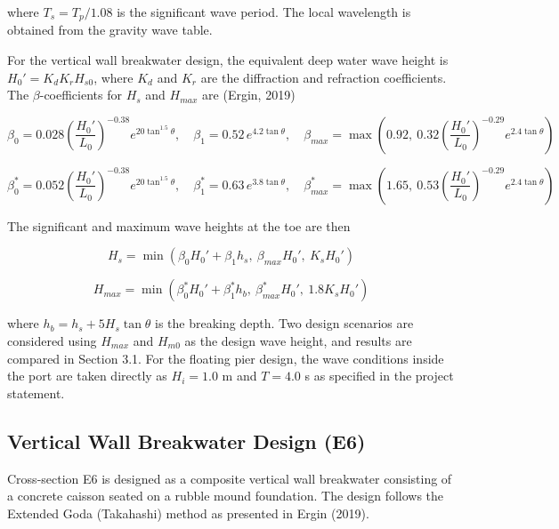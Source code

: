 \documentclass[a4paper, 11pt]{article}
\begin{document}
where $T_s = T_p/1.08$ is the significant wave period. The local wavelength is obtained from the gravity wave table.

For the vertical wall breakwater design, the equivalent deep water wave height is $H_0' = K_d K_r H_{s0}$, where $K_d$ and $K_r$ are the diffraction and refraction coefficients. The $\beta$-coefficients for $H_s$ and $H_{max}$ are (Ergin, 2019)

\begin{equation}
    \beta_0 = 0.028\left(\frac{H_0'}{L_0}\right)^{-0.38} e^{20\tan^{1.5}\theta}, \quad \beta_1 = 0.52\, e^{4.2\tan\theta}, \quad \beta_{max} = \max\!\left(0.92,\ 0.32\left(\frac{H_0'}{L_0}\right)^{-0.29} e^{2.4\tan\theta}\right)
\end{equation}

\begin{equation}
    \beta_0^* = 0.052\left(\frac{H_0'}{L_0}\right)^{-0.38} e^{20\tan^{1.5}\theta}, \quad \beta_1^* = 0.63\, e^{3.8\tan\theta}, \quad \beta_{max}^* = \max\!\left(1.65,\ 0.53\left(\frac{H_0'}{L_0}\right)^{-0.29} e^{2.4\tan\theta}\right)
\end{equation}

The significant and maximum wave heights at the toe are then

\begin{equation}
    H_s = \min\!\left(\beta_0 H_0' + \beta_1 h_s,\ \beta_{max} H_0',\ K_s H_0'\right)
\end{equation}

\begin{equation}
    H_{max} = \min\!\left(\beta_0^* H_0' + \beta_1^* h_b,\ \beta_{max}^* H_0',\ 1.8K_s H_0'\right)
\end{equation}

where $h_b = h_s + 5H_s\tan\theta$ is the breaking depth. Two design scenarios are considered using $H_{max}$ and $H_{m0}$ as the design wave height, and results are compared in Section 3.1. For the floating pier design, the wave conditions inside the port are taken directly as $H_i = 1.0$ m and $T = 4.0$ s as specified in the project statement.

\subsection{Vertical Wall Breakwater Design (E6)}

\hspace*{0.5cm} Cross-section E6 is designed as a composite vertical wall breakwater consisting of a concrete caisson seated on a rubble mound foundation. The design follows the Extended Goda (Takahashi) method as presented in Ergin (2019).
\end{document}
